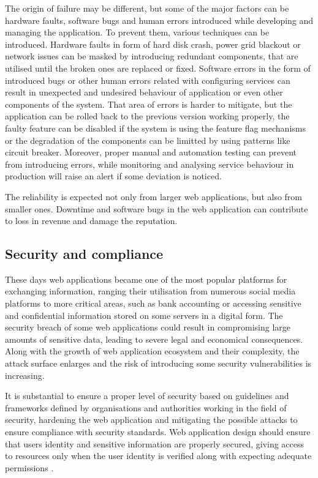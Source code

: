 The origin of failure may be different, but some of the major factors can be hardware faults, software bugs and human errors introduced while developing and managing the application. To prevent them, various techniques can be introduced. Hardware faults in form of hard disk crash, power grid blackout or network issues can be masked by introducing redundant components, that are utilised until the broken ones are replaced or fixed. Software errors in the form of introduced bugs or other human errors related with configuring services can result in unexpected and undesired behaviour of application or even other components of the system. That area of errors is harder to mitigate, but the application can be rolled back to the previous version working properly, the faulty feature can be disabled if the system is using the feature flag mechanisms or the degradation of the components can be limitted by using patterns like circuit breaker. Moreover, proper manual and automation testing can prevent from introducing errors, while monitoring and analysing service behaviour in production will raise an alert if some deviation is noticed. 

The reliability is expected not only from larger web applications, but also from smaller ones. Downtime and software bugs in the web application can contribute to loss in revenue and damage the reputation.

\subsection{Security and compliance}

These days web applications became one of the most popular platforms for exchanging information, ranging their utilisation from numerous social media platforms to more critical areas, such as bank accounting or accessing sensitive and confidential information stored on some servers in a digital form. The security breach of some web applications could result in compromising large amounts of sensitive data, leading to severe legal and economical consequences. Along with the growth of web application ecosystem and their complexity, the attack surface enlarges and the risk of introducing some security vulnerabilities is increasing.

It is substantial to ensure a proper level of security based on guidelines and frameworks defined by organisations and authorities working in the field of security, hardening the web application and mitigating the possible attacks to ensure compliance with security standards. Web application design should ensure that users identity and sensitive information are properly secured, giving access to resources only when the user identity is verified along with expecting adequate permissions \cite{ASurveyonWebApplicationSecurity}.

